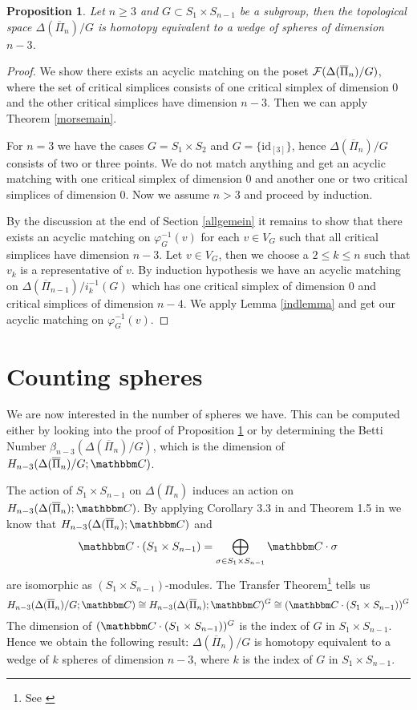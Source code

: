 \documentclass{elsarticle}
\newtheorem{prop}[df]{Proposition}
\def\id{\textrm{id}}
\def\C{\mathbbm C}
\begin{document}
\begin{prop}
\label{rdthm}
Let $n\geq3$ and $G\subset S_1\times S_{n-1}$ be a subgroup, then the topological space $\Delta(\overline{\Pi}_n)/G$ is homotopy equivalent to a wedge of spheres of dimension $n-3$.
\end{prop}
\begin{proof}
We show there exists an acyclic matching on the poset ${\cal F}(\Delta(\overline{\Pi}_n)/G)$, where the set of critical simplices consists of one critical simplex of dimension $0$ and the other critical simplices have dimension $n-3$. Then we can apply Theorem \ref{morsemain}.

For $n=3$ we have the cases $G=S_1\times S_2$ and $G=\{\id_{[3]}\}$, hence $\Delta(\overline{\Pi}_n)/G$ consists of two or three points. We do not match anything and get an acyclic matching with one critical simplex of dimension $0$ and another one or two critical simplices of dimension $0$. Now we assume $n>3$ and proceed by induction.

By the discussion at the end of Section \ref{allgemein} it remains to show that there exists an acyclic matching on $\varphi_G^{-1}(v)$ for each $v\in V_G$ such that all critical simplices have dimension $n-3$. Let $v\in V_G$, then we choose a $2\leq k\leq n$ such that $v_k$ is a representative of $v$. By induction hypothesis we have an acyclic matching on $\Delta(\overline{\Pi}_{n-1})/i_k^{-1}(G)$ which has one critical simplex of dimension $0$ and critical simplices of dimension $n-4$. We apply Lemma \ref{indlemma} and get our acyclic matching on $\varphi_G^{-1}(v)$.
\end{proof}
\section{Counting spheres}
\label{giacomo}
We are now interested in the number of spheres we have. This can be computed either by looking into the proof of Proposition \ref{rdthm} or by determining the Betti Number $\beta_{n-3}(\Delta(\overline{\Pi}_n)/G)$, which is the dimension of $H_{n-3}(\Delta(\overline{\Pi}_n)/G;\C)$.

The action of $S_1\times S_{n-1}$ on $\Delta(\overline{\Pi}_n)$ induces an action on $H_{n-3}(\Delta(\overline{\Pi}_n);\C)$. By applying Corollary 3.3 in \cite{emk} and Theorem 1.5 in \cite{white} we know that $H_{n-3}(\Delta(\overline{\Pi}_n);\C)$ and
\[\C\cdot(S_1\times S_{n-1})=\bigoplus_{\sigma\in S_1\times S_{n-1}}\C\cdot\sigma\]
are isomorphic as $(S_1\times S_{n-1})$-modules.
The Transfer Theorem\footnote{See \cite{transfer}} tells us
\[
H_{n-3}(\Delta(\overline{\Pi}_n)/G;\C)\cong H_{n-3}(\Delta(\overline{\Pi}_n);\C)^G\cong(\C\cdot(S_1\times S_{n-1}))^G
\]
The dimension of $(\C\cdot(S_1\times S_{n-1}))^G$ is the index of $G$ in $S_1\times S_{n-1}$. Hence we obtain the following result: $\Delta(\overline{\Pi}_n)/G$ is homotopy equivalent to a wedge of $k$ spheres of dimension $n-3$, where $k$ is the index of $G$ in $S_1\times S_{n-1}$.
\end{document}
